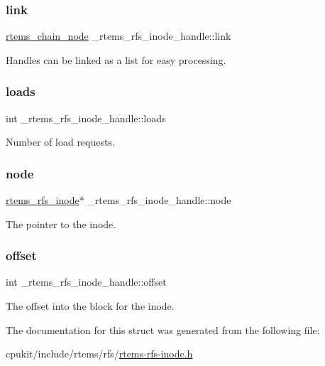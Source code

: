 \subsubsection{\texorpdfstring{link}{link}}
{\footnotesize\ttfamily \mbox{\hyperlink{structChain__Node__struct}{rtems\+\_\+chain\+\_\+node}} \+\_\+rtems\+\_\+rfs\+\_\+inode\+\_\+handle\+::link}

Handles can be linked as a list for easy processing. \mbox{\label{struct__rtems__rfs__inode__handle_a397ef6df93f9776c82abcfff393e2968}} 
\subsubsection{\texorpdfstring{loads}{loads}}
{\footnotesize\ttfamily int \+\_\+rtems\+\_\+rfs\+\_\+inode\+\_\+handle\+::loads}

Number of load requests. \mbox{\label{struct__rtems__rfs__inode__handle_ab1fb791b619ee730f7e01c7a1c3d5cfb}} 
\subsubsection{\texorpdfstring{node}{node}}
{\footnotesize\ttfamily \mbox{\hyperlink{rtems-rfs-inode_8h_a119b0085992c786d2f91b17a5ce11434}{rtems\+\_\+rfs\+\_\+inode}}$\ast$ \+\_\+rtems\+\_\+rfs\+\_\+inode\+\_\+handle\+::node}

The pointer to the inode. \mbox{\label{struct__rtems__rfs__inode__handle_a129042145274b3959eb5f284f16b5f7b}} 
\subsubsection{\texorpdfstring{offset}{offset}}
{\footnotesize\ttfamily int \+\_\+rtems\+\_\+rfs\+\_\+inode\+\_\+handle\+::offset}

The offset into the block for the inode. 

The documentation for this struct was generated from the following file\+:\begin{DoxyCompactItemize}
\item 
cpukit/include/rtems/rfs/\mbox{\hyperlink{rtems-rfs-inode_8h}{rtems-\/rfs-\/inode.\+h}}\end{DoxyCompactItemize}
